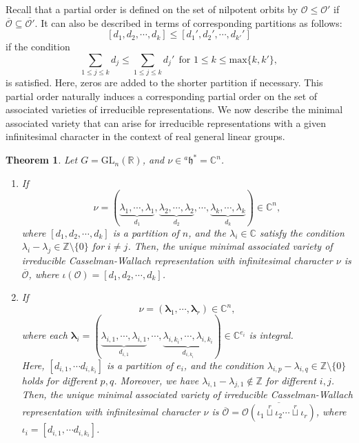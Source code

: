 \documentclass[12pt, a4paper]{amsart}
\numberwithin{equation}{section}
\newtheorem{thm}{Theorem}[section]
\newcommand{\blam}{{\boldsymbol{\lambda}}}
\newcommand{\BC}{{\mathbb {C}}}
\newcommand{\BR}{{\mathbb {R}}}
\newcommand{\BZ}{{\mathbb {Z}}}
\newcommand{\CO}{{\mathcal {O}}}
\newcommand{\fh}{\mathfrak{h}}
\newcommand{\GL}{{\mathrm{GL}}}
\renewcommand{\bar}{\overline}
\begin{document}
Recall that a partial order is defined on the set of nilpotent orbits by $\CO \leq \CO'$ if $\bar{\CO} \subseteq \bar{\CO'}$. It can also be described in terms of corresponding partitions as follows: 
\[
[d_1, d_2, \cdots , d_k] \leq [d_1', d_2', \cdots , d_{k'}']
\]
if the condition
\[
    \sum_{1 \leq j \leq k} d_{j} \leq \sum_{1 \leq j \leq k} d_{j}' \  \ \textrm{for $1 \leq k \leq \mathrm{max}\{k,k'\}$},
\]
is satisfied. Here, zeros are added to the shorter partition if necessary.
This partial order naturally induces a corresponding partial order on the set of associated varieties of irreducible representations. We now describe the minimal associated variety that can arise for irreducible representations with a given infinitesimal character in the context of real general linear groups.

\begin{thm}\label{minimal}
    Let $G = \GL_n(\BR)$, and $\nu \in {^{a}\fh}^* = \BC^n$.
    \begin{enumerate}
        \item If 
        \[
        \nu = (\underbrace{\lambda_1, \cdots, \lambda_1}_{d_1}, \underbrace{\lambda_2, \cdots, \lambda_2}_{d_2}, \cdots, \underbrace{\lambda_k, \cdots, \lambda_k}_{d_k}) \in \BC^n,
        \]
        where $[d_1, d_2, \cdots , d_k]$ is a partition of $n$, and the $\lambda_i \in \BC$ satisfy the condition $\lambda_i - \lambda_j \in \BZ \setminus \{0\}$ for $i \neq j$. Then, the unique minimal associated variety of irreducible Casselman-Wallach representation with infinitesimal character $\nu$ is $\bar{\CO}$, where $\iota(\CO) = [d_1, d_2, \cdots , d_k]$.
        \item If
                \[
                \nu = (\blam_1, \cdots, \blam_r) \in \BC^n,
                \]
                where each $\blam_i = (\underbrace{\lambda_{i,1}, \cdots, \lambda_{i,1}}_{d_{i,1}}, \cdots, \underbrace{\lambda_{i,k_i}, \cdots, \lambda_{i,k_i}}_{d_{i,k_i}}) \in \BC^{e_i}$ is integral.\\
                Here, $[d_{i,1}, \cdots d_{i,k_i} ]$ is a partition of $e_i$, and the condition $\lambda_{i,p} - \lambda_{i,q} \in \BZ \setminus \{0\}$ holds for different $p, q$. Moreover, we have $\lambda_{i,1} - \lambda_{j,1} \notin \BZ$ for different $i, j$. Then, the unique minimal associated variety of irreducible Casselman-Wallach representation with infinitesimal character $\nu$ is $\bar{\CO} = \bar{\CO(\iota_1 \mathop{\sqcup}\limits^r \iota_2 \cdots \mathop{\sqcup}\limits^r  \iota_r)} $, where $\iota_i = [d_{i,1}, \cdots d_{i,k_i}]$.
    \end{enumerate}
\end{thm}
\end{document}
